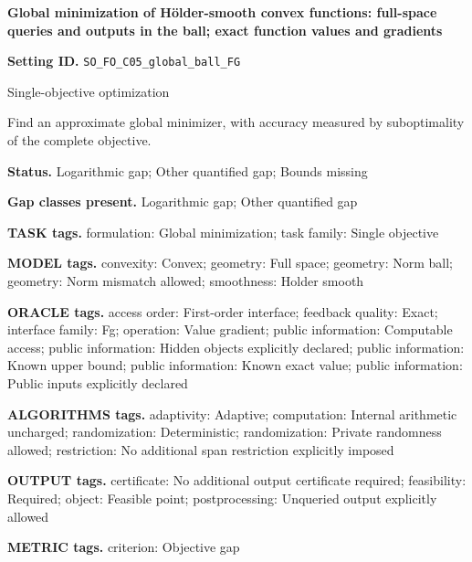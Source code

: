 \documentclass[10pt,a4paper]{article}
\begin{document}
\raggedright

{\LARGE\bfseries\sffamily\color{AtlasNavy} Global minimization of Hölder-smooth convex functions: full-space queries and outputs in the ball; exact function values and gradients\par}\vspace{5pt}


\textbf{Setting ID.} \texttt{SO\_\allowbreak{}FO\_\allowbreak{}C05\_\allowbreak{}global\_\allowbreak{}ball\_\allowbreak{}FG}



Single-objective optimization



Find an approximate global minimizer, with accuracy measured by suboptimality of the complete objective.



\textbf{Status.} Logarithmic gap; Other quantified gap; Bounds missing



\textbf{Gap classes present.} Logarithmic gap; Other quantified gap



\textbf{TASK tags.} formulation: Global minimization; task family: Single objective



\textbf{MODEL tags.} convexity: Convex; geometry: Full space; geometry: Norm ball; geometry: Norm mismatch allowed; smoothness: Holder smooth



\textbf{ORACLE tags.} access order: First-order interface; feedback quality: Exact; interface family: Fg; operation: Value gradient; public information: Computable access; public information: Hidden objects explicitly declared; public information: Known upper bound; public information: Known exact value; public information: Public inputs explicitly declared



\textbf{ALGORITHMS tags.} adaptivity: Adaptive; computation: Internal arithmetic uncharged; randomization: Deterministic; randomization: Private randomness allowed; restriction: No additional span restriction explicitly imposed



\textbf{OUTPUT tags.} certificate: No additional output certificate required; feasibility: Required; object: Feasible point; postprocessing: Unqueried output explicitly allowed



\textbf{METRIC tags.} criterion: Objective gap
\end{document}

